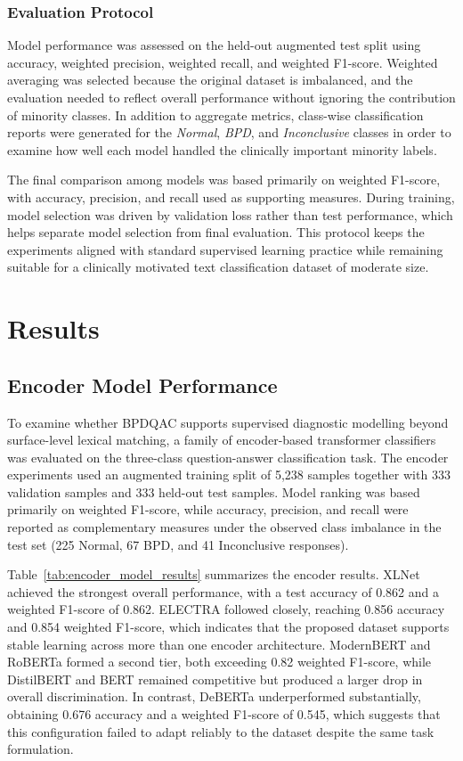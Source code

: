 \documentclass{article}
\begin{document}
\subsubsection{Evaluation Protocol}
Model performance was assessed on the held-out augmented test split using accuracy, weighted precision, weighted recall, and weighted F1-score. Weighted averaging was selected because the original dataset is imbalanced, and the evaluation needed to reflect overall performance without ignoring the contribution of minority classes. In addition to aggregate metrics, class-wise classification reports were generated for the \textit{Normal}, \textit{BPD}, and \textit{Inconclusive} classes in order to examine how well each model handled the clinically important minority labels.

The final comparison among models was based primarily on weighted F1-score, with accuracy, precision, and recall used as supporting measures. During training, model selection was driven by validation loss rather than test performance, which helps separate model selection from final evaluation. This protocol keeps the experiments aligned with standard supervised learning practice while remaining suitable for a clinically motivated text classification dataset of moderate size.

\section{Results}\label{sec7}

\subsection{Encoder Model Performance}
To examine whether BPDQAC supports supervised diagnostic modelling beyond surface-level lexical matching, a family of encoder-based transformer classifiers was evaluated on the three-class question-answer classification task. The encoder experiments used an augmented training split of 5,238 samples together with 333 validation samples and 333 held-out test samples. Model ranking was based primarily on weighted F1-score, while accuracy, precision, and recall were reported as complementary measures under the observed class imbalance in the test set (225 Normal, 67 BPD, and 41 Inconclusive responses).

Table~\ref{tab:encoder_model_results} summarizes the encoder results. XLNet achieved the strongest overall performance, with a test accuracy of 0.862 and a weighted F1-score of 0.862. ELECTRA followed closely, reaching 0.856 accuracy and 0.854 weighted F1-score, which indicates that the proposed dataset supports stable learning across more than one encoder architecture. ModernBERT and RoBERTa formed a second tier, both exceeding 0.82 weighted F1-score, while DistilBERT and BERT remained competitive but produced a larger drop in overall discrimination. In contrast, DeBERTa underperformed substantially, obtaining 0.676 accuracy and a weighted F1-score of 0.545, which suggests that this configuration failed to adapt reliably to the dataset despite the same task formulation.
\end{document}
